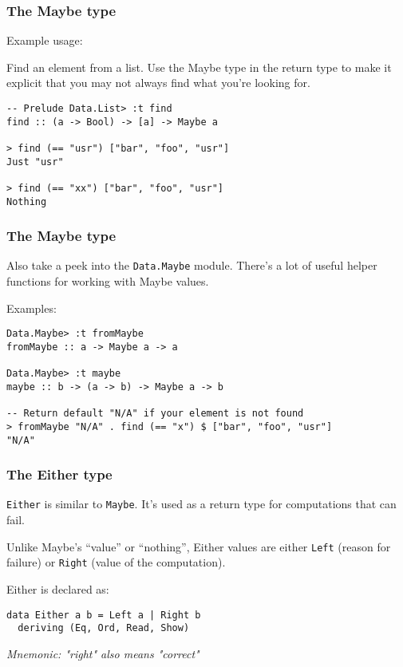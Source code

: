 \documentclass{beamer}
\begin{document}
\begin{frame}[fragile]
\frametitle{The Maybe type}
Example usage:

\bigskip

Find an element from a list.  Use the Maybe type in the return type to
make it explicit that you may not always find what you're looking for.

\bigskip
\begin{verbatim}
-- Prelude Data.List> :t find
find :: (a -> Bool) -> [a] -> Maybe a

> find (== "usr") ["bar", "foo", "usr"]
Just "usr"

> find (== "xx") ["bar", "foo", "usr"]
Nothing
\end{verbatim}

\end{frame}


\begin{frame}[fragile]
\frametitle{The Maybe type}

Also take a peek into the \verb+Data.Maybe+ module.  There's a lot of
useful helper functions for working with Maybe values.
\bigskip

Examples:

\begin{verbatim}
Data.Maybe> :t fromMaybe
fromMaybe :: a -> Maybe a -> a

Data.Maybe> :t maybe
maybe :: b -> (a -> b) -> Maybe a -> b

-- Return default "N/A" if your element is not found
> fromMaybe "N/A" . find (== "x") $ ["bar", "foo", "usr"]
"N/A"
\end{verbatim}

\end{frame}


\begin{frame}[fragile]
\frametitle{The Either type}

\verb+Either+ is similar to \verb+Maybe+.  It's used as a return type
for computations that can fail.

\bigskip
Unlike Maybe's ``value'' or ``nothing'', Either values are either
\verb+Left+ (reason for failure) or \verb+Right+ (value of the
computation).

\bigskip
Either is declared as:
\bigskip
\begin{verbatim}
data Either a b = Left a | Right b
  deriving (Eq, Ord, Read, Show)
\end{verbatim}

\bigskip
{\em Mnemonic: "right" also means "correct"}

\end{frame}
\end{document}
